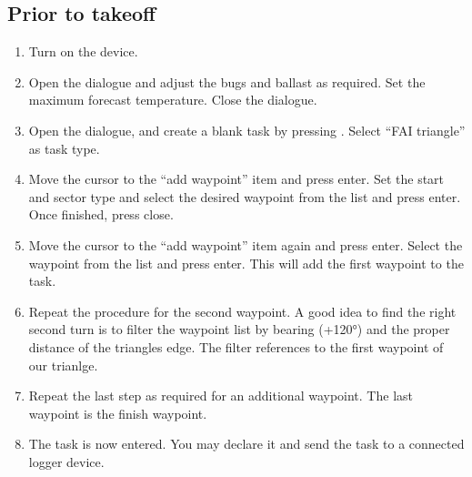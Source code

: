 \subsection*{Prior to takeoff}
\begin{enumerate}
\item  Turn on the device.
\item  Open the  dialogue and adjust the bugs and ballast as
  required. Set the maximum forecast temperature.  Close the dialogue.
\item  Open the  dialogue, and create a blank task by pressing
. Select ``FAI triangle'' as task type.
\item  Move the cursor to the ``add waypoint'' item and press enter.  Set the
  start and sector type and select the desired waypoint from the list and press 
  enter.  Once finished, press close.
\item  Move the cursor to the ``add waypoint'' item again and press enter. 
  Select the waypoint from the list and press enter.  This will add the first 
  waypoint to the task.
\item  Repeat the procedure for the second waypoint. A good idea to find the
  right second turn is to filter the waypoint list by bearing (+120°) and the
  proper distance of the triangles edge. The filter references to
  the first waypoint of our trianlge.
\item  Repeat the last step as required for an additional waypoint.  The last
  waypoint is the finish waypoint.
\item  The task is now entered.  You may declare it and send the task to a
  connected logger device.
\end{enumerate}

